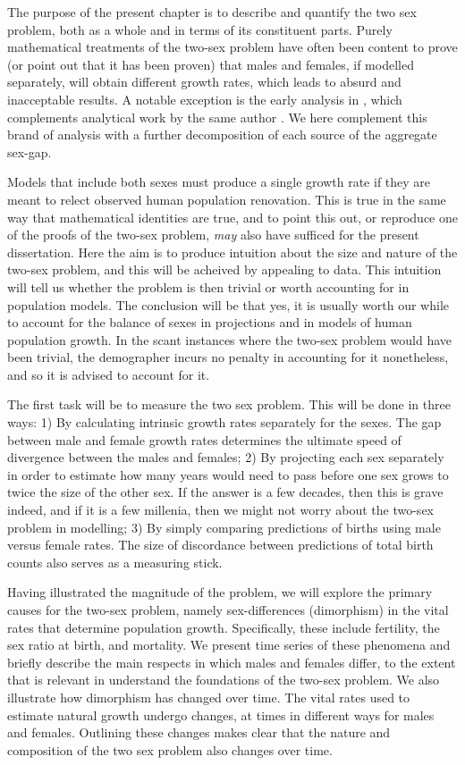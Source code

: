 \label{ch:Measuring}
The purpose of the present chapter is to describe and quantify the two sex
problem, both as a whole and in terms of its constituent parts. Purely
mathematical treatments of the two-sex problem have often been content to 
prove (or point out that it has been proven) that males and females,
if modelled separately, will obtain different growth rates, which leads to
absurd and inacceptable results. A notable exception is the early analysis in
\citet{karmel1948analysis}, which complements analytical work by the same author
\citep{karmel1947relations,karmel1948relations}. We here complement this brand
of analysis with a further decomposition of each source of the aggregate
sex-gap. 

Models that include both sexes must produce a single growth 
rate if they are meant to relect observed human population renovation. 
This is true in the same way that mathematical identities are true, and to point this out, or reproduce one of the proofs of the two-sex problem, \textit{may} also have sufficed for the present dissertation. Here the aim is to produce intuition about the size and nature of the two-sex problem, and this will be
acheived by appealing to data. This intuition will tell us whether the 
problem is then trivial or worth accounting for in
population models. The conclusion will be that yes, it is usually worth our
while to account for the balance of sexes in projections and in models of human
population growth. In the scant instances where the two-sex problem would have
been trivial, the demographer incurs no penalty in accounting for it
nonetheless, and so it is advised to account for it.

The first task will be to measure the two sex problem. This will be done in
three ways: 1) By calculating intrinsic growth rates separately for the sexes.
The gap between male and female growth rates determines the ultimate speed of
divergence between the males and females; 2) By projecting each sex separately
in order to estimate how many years would need to pass before one sex grows to
twice the size of the other sex. If the answer is a few decades, then this is
grave indeed, and if it is a few millenia, then we might not worry about the
two-sex problem in modelling; 3) By simply comparing predictions of births using
male versus female rates. The size of discordance between predictions of total
birth counts also serves as a measuring stick.

Having illustrated the magnitude of the problem, we will explore the primary
causes for the two-sex problem, namely sex-differences (dimorphism) in the vital rates
that determine population growth. Specifically, these include fertility, the sex
ratio at birth, and mortality. We present time series of these phenomena and
briefly describe the main respects in which males and females differ, to the
extent that is relevant in understand the foundations of the two-sex problem. We
also illustrate how dimorphism has changed over time. The vital rates
used to estimate natural growth undergo changes, at times in different ways for
males and females. Outlining these changes makes clear that the nature and
composition of the two sex problem also changes over time.

